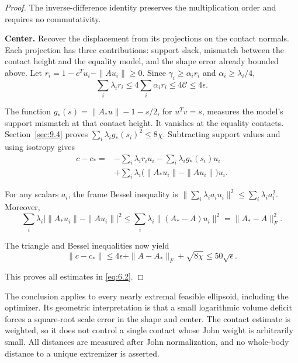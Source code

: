 \begin{proof}
The inverse-difference identity preserves the multiplication order and requires no commutativity.

\textbf{Center.} Recover the displacement from its projections on the contact
normals. Each projection has three contributions: support slack, mismatch
between the contact height and the equality model, and the shape error already
bounded above. Let $r_i=1-c^Tu_i-\|Au_i\|\ge0$. Since
$\gamma_i\ge\alpha_i r_i$ and $\alpha_i\ge\lambda_i/4$,
\begin{equation}\label{eq:6.6}
\sum_i\lambda_i r_i\le4\sum_i\alpha_i r_i\le4\mathcal C\le4\epsilon.
\end{equation}

The function $g_*(s)=\|A_*u\|-1-s/2$, for $u^Tv=s$, measures the model's
support mismatch at that contact height. It vanishes at the equality contacts.
Section~\ref{sec:9.4} proves
$\sum_i\lambda_i g_*(s_i)^2\le8\chi$. Subtracting support values and using isotropy gives
\begin{equation}\label{eq:6.7}
\begin{aligned}
c-c_*={}&-\sum_i\lambda_i r_i u_i
-\sum_i\lambda_i g_*(s_i)u_i\\
&+\sum_i\lambda_i\bigl(\|A_*u_i\|-\|Au_i\|\bigr)u_i.
\end{aligned}
\end{equation}

For any scalars $a_i$, the frame Bessel inequality is
$\|\sum_i\lambda_i a_i u_i\|^2\le\sum_i\lambda_i a_i^2$.
Moreover,
\begin{equation}\label{eq:6.8}
\sum_i\lambda_i\bigl|\|A_*u_i\|-\|Au_i\|\bigr|^2
\le\sum_i\lambda_i\|(A_*-A)u_i\|^2=\|A_*-A\|_F^2.
\end{equation}

The triangle and Bessel inequalities now yield
\begin{equation}\label{eq:6.9}
\|c-c_*\|\le4\epsilon+\|A-A_*\|_F+\sqrt{8\chi}
\le50\sqrt\epsilon.
\end{equation}

This proves all estimates in \eqref{eq:6.2}. 
\end{proof}

The conclusion applies to every nearly extremal feasible ellipsoid, including the optimizer. Its geometric interpretation is that a small logarithmic volume deficit forces a square-root scale error in the shape and center. The contact estimate is weighted, so it does not control a single contact whose John weight is arbitrarily small. All distances are measured after John normalization, and no whole-body distance to a unique extremizer is asserted.
